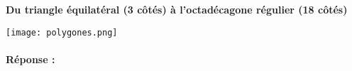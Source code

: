 \documentclass[11pt,a4paper,colorlinks,breaklinks]{article}
\begin{document}
\centerline{\textbf{Du triangle équilatéral (3 côtés) à l'octadécagone régulier (18 côtés)}}
\centerline{\texttt{[image: polygones.png]}}


\paragraph{Réponse :}\mbox{}

\noindent\framebox[\textwidth]{$\rule{0cm}{0.96\textheight}$}



\end{document}
